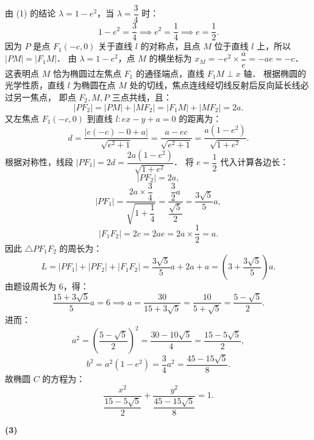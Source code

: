 \begin{answer}
由 (1) 的结论 $\lambda = 1 - e^2$，当 $\lambda = \dfrac{3}{4}$ 时：
\nopagebreak[4]
\[
1 - e^2 = \frac{3}{4} \implies e^2 = \frac{1}{4} \implies e = \frac{1}{2}.
\]
因为 $P$ 是点 $F_1(-c, 0)$ 关于直线 $l$ 的对称点，且点 $M$ 位于直线 $l$ 上，所以 $|PM| = |F_1M|$．
由 $\lambda = 1 - e^2$，点 $M$ 的横坐标为 $x_M = -e^2 \times \dfrac{a}{e} = -ae = -c$．
这表明点 $M$ 恰为椭圆过左焦点 $F_1$ 的通径端点，直线 $F_1M \perp x$ 轴．
根据椭圆的光学性质，直线 $l$ 为椭圆在点 $M$ 处的切线，焦点连线经切线反射后反向延长线必过另一焦点，
即点 $F_2, M, P$ 三点共线，且：
\nopagebreak[4]
\[
|PF_2| = |PM| + |MF_2| = |F_1M| + |MF_2| = 2a.
\]
又左焦点 $F_1(-c, 0)$ 到直线 $l: ex - y + a = 0$ 的距离为：
\nopagebreak[4]
\[
d = \frac{|e(-c) - 0 + a|}{\sqrt{e^2 + 1}} = \frac{a - ec}{\sqrt{e^2 + 1}} = \frac{a(1 - e^2)}{\sqrt{1 + e^2}}.
\]
根据对称性，线段 $|PF_1| = 2d = \dfrac{2a(1 - e^2)}{\sqrt{1 + e^2}}$．
将 $e = \dfrac{1}{2}$ 代入计算各边长：
\nopagebreak[4]
\[
|PF_2| = 2a,
\]
\nopagebreak[4]
\[
|PF_1| = \frac{2a \times \dfrac{3}{4}}{\sqrt{1 + \dfrac{1}{4}}} = \frac{\dfrac{3}{2}a}{\dfrac{\sqrt{5}}{2}} = \frac{3\sqrt{5}}{5}a,
\]
\nopagebreak[4]
\[
|F_1F_2| = 2c = 2ae = 2a \times \frac{1}{2} = a.
\]
因此 $\triangle PF_1F_2$ 的周长为：
\nopagebreak[4]
\[
L = |PF_1| + |PF_2| + |F_1F_2| = \frac{3\sqrt{5}}{5}a + 2a + a = \left(3 + \frac{3\sqrt{5}}{5}\right)a.
\]
由题设周长为 6，得：
\nopagebreak[4]
\[
\frac{15 + 3\sqrt{5}}{5}a = 6 \implies a = \frac{30}{15 + 3\sqrt{5}} = \frac{10}{5 + \sqrt{5}} = \frac{5 - \sqrt{5}}{2}.
\]
进而：
\nopagebreak[4]
\[
a^2 = \left(\frac{5 - \sqrt{5}}{2}\right)^2 = \frac{30 - 10\sqrt{5}}{4} = \frac{15 - 5\sqrt{5}}{2},
\]
\nopagebreak[4]
\[
b^2 = a^2(1 - e^2) = \frac{3}{4}a^2 = \frac{45 - 15\sqrt{5}}{8}.
\]
故椭圆 $C$ 的方程为：
\nopagebreak[4]
\[
\frac{x^2}{\dfrac{15 - 5\sqrt{5}}{2}} + \frac{y^2}{\dfrac{45 - 15\sqrt{5}}{8}} = 1.
\]

\textbf{(3)}


\end{answer}
